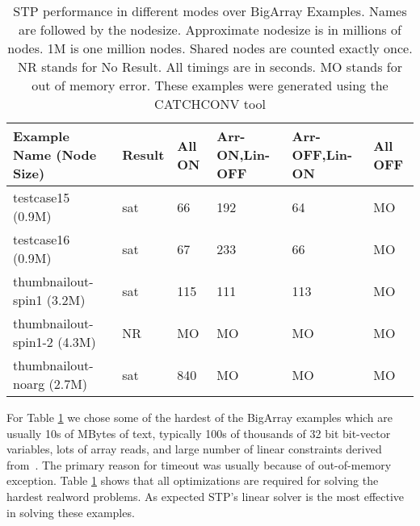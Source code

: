 \begin{table}[t]
\begin{center}
\begin{tabular}{|l|l|l|l|l|l|}
\hline
{\bf Example Name (Node Size)} & {\bf Result} & {\bf All ON} & {\bf Arr-ON,Lin-OFF} & {\bf Arr-OFF,Lin-ON} & {\bf All OFF}\\
\hline
testcase15 (0.9M) & sat & 66 & 192 & 64  & MO \\
testcase16 (0.9M) & sat & 67 & 233 & 66  & MO \\
thumbnailout-spin1 (3.2M)& sat & 115 & 111 & 113 & MO \\
thumbnailout-spin1-2 (4.3M)& NR & MO & MO & MO  & MO \\
thumbnailout-noarg (2.7M)& sat & 840 & MO & MO  & MO \\
\hline
\end{tabular}
\end{center}
\caption{STP performance in different modes over BigArray
Examples. Names are followed by the nodesize. Approximate nodesize is
in millions of nodes. 1M is one million nodes. Shared nodes are
counted exactly once. NR stands for No Result.  All timings are in
seconds. MO stands for out of memory error. These examples were
generated using the CATCHCONV tool}
\label{STP-table}
\end{table}

For Table \ref{STP-table} we chose some of the hardest of the BigArray
examples which are usually 10s of MBytes of text, typically 100s of
thousands of 32 bit bit-vector variables, lots of array reads, and
large number of linear constraints derived
from~\cite{catchconv07,replayer06}. The primary reason for timeout was
usually because of out-of-memory exception. Table \ref{STP-table}
shows that all optimizations are required for solving the hardest
realword problems. As expected STP's linear solver is the most
effective in solving these examples.

